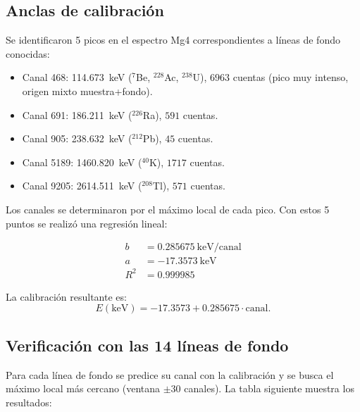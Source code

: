 \documentclass[12pt,a4paper]{article}
\begin{document}
\subsection*{Anclas de calibraci\'on}
Se identificaron 5 picos en el espectro Mg4 correspondientes a l\'ineas de
fondo conocidas:
\begin{itemize}
  \item Canal 468: 114.673~keV ($^{7}$Be, $^{228}$Ac, $^{238}$U),
    $6963$ cuentas (pico muy intenso, origen mixto muestra+fondo).
  \item Canal 691: 186.211~keV ($^{226}$Ra), $591$ cuentas.
  \item Canal 905: 238.632~keV ($^{212}$Pb), $45$ cuentas.
  \item Canal 5189: 1460.820~keV ($^{40}$K), $1717$ cuentas.
  \item Canal 9205: 2614.511~keV ($^{208}$Tl), $571$ cuentas.
\end{itemize}
Los canales se determinaron por el m\'aximo local de cada pico.
Con estos 5 puntos se realiz\'o una regresi\'on lineal:

\[
\begin{aligned}
b &= 0.285675\ \text{keV/canal} \\
a &= -17.3573\ \text{keV} \\
R^2 &= 0.999985
\end{aligned}
\]

La calibraci\'on resultante es:
\[
E(\text{keV}) = -17.3573 + 0.285675 \cdot \text{canal}.
\]

\subsection*{Verificaci\'on con las 14 l\'ineas de fondo}
Para cada l\'inea de fondo se predice su canal con la calibraci\'on y se
busca el m\'aximo local m\'as cercano (ventana $\pm30$ canales).
La tabla siguiente muestra los resultados:
\end{document}

